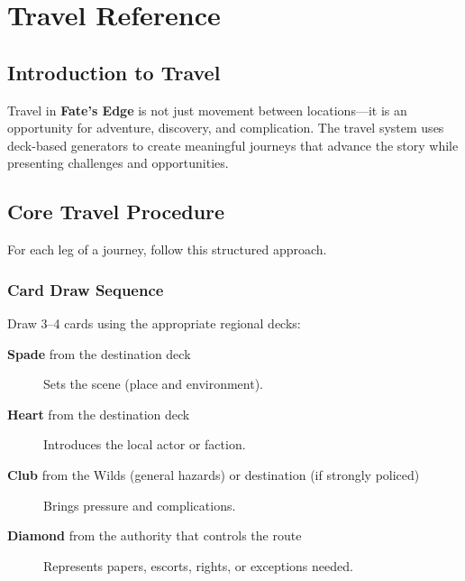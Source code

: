 
\chapter{Travel Reference}\label{chap:travel_reference}

\section{Introduction to Travel}\label{sec:travel_intro}

Travel in \textbf{Fate's Edge} is not just movement between locations---it is an opportunity for adventure, discovery, and complication. The travel system uses deck-based generators to create meaningful journeys that advance the story while presenting challenges and opportunities.

\section{Core Travel Procedure}\label{sec:core_travel}

For each leg of a journey, follow this structured approach.

\subsection{Card Draw Sequence}\label{subsec:card_draw}

Draw 3--4 cards using the appropriate regional decks:

\begin{description}
    \item[\textbf{Spade} from the destination deck] Sets the scene (place and environment).
    \item[\textbf{Heart} from the destination deck] Introduces the local actor or faction.
    \item[\textbf{Club} from the Wilds (general hazards) or destination (if strongly policed)] Brings pressure and complications.
    \item[\textbf{Diamond} from the authority that controls the route] Represents papers, escorts, rights, or exceptions needed.
\end{description}

